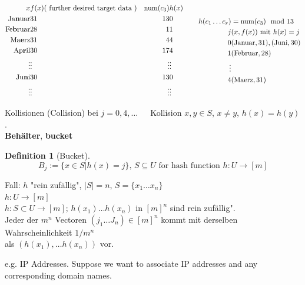 \documentclass[10pt]{amsart}
\newtheorem{definition}{Definition}
\begin{document}
\[
\begin{gathered}
\begin{aligned} 
x & f(x) (\text{ further desired target data }) & \text{num}(c_3) & h(x) \\
\text{Ja\textbf{n}uar} & 31 & 13 & 0 \\
\text{Fe\textbf{b}ruar} & 28 & 1 & 1 \\
\text{Ma\textbf{e}rz} & 31 & 4 & 4 \\
\text{Ap\textbf{r}il} & 30 & 17 & 4 \\
\vdots & \vdots & \vdots & \vdots \\ 
\text{Ju\textbf{n}i} & 30 & 13 & 0 \\
\vdots & \vdots & \vdots & \vdots 
\end{aligned} 
\quad \quad \, 
\begin{aligned}
h(c_1 \dots c_r) & = \text{num}(c_3) \mod{13} \\
j & (x,f(x)) \text{ mit } h(x) = j \\ 
0 & (\text{Januar}, 31), (\text{Juni}, 30) \\
1 & (\text{Februar}, 28) \\
\vdots & \\
4 & (\text{Maerz}, 31) 
\end{aligned}
\end{gathered}
\]

Kollisionen (Collision) bei $j= 0,4, \dots  \quad \,$ Kollision $x, y \in S$, $x\neq y$, $h(x) = h(y)$.  \\

\textbf{Beh\"{a}lter}, \textbf{bucket}
\begin{definition}[Bucket]
	\begin{equation}
	B_j := \lbrace x \in S | h(x) = j \rbrace, \, S\subseteq U \text{ for hash function } h : U\to [m] 
	\end{equation}
\end{definition}

Fall: $h$ "rein zuf\"{a}llig", $|S| = n$, $S= \lbrace x_1 \dots x_n \rbrace$ \\
$h : U \to [m]$ \\
$h: S \subset U \to [m]$; $h(x_1) \dots h(x_n)$ in $[m]^n$ sind rein zuf\"{a}llig".  \\

Jeder der $m^n$ Vectoren $(j_1 \dots J_n) \in [m]^n$ kommt mit derselben Wahrscheinlichkeit $1/m^n$ \\
als $(h(x_1), \dots h(x_n))$ vor.

e.g. IP Addresses. Suppose we want to associate IP addresses and any corresponding domain names.
\end{document}
